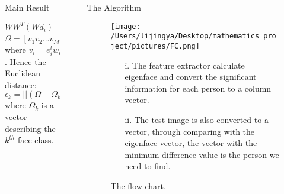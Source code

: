 \documentclass[final]{beamer}
\newlength{\sepwid}
\newlength{\onecolwid}
\newlength{\middlecolwid}
\begin{document}
\begin{frame}[t]
\begin{columns}[t]
\begin{column}{\middlecolwid}
\begin{alertblock}{Main Result}
\end{alertblock}

\vspace{-5mm}

\begin{block}

 
\begin{equation*}
WW^T(Wd_i) =\mu_i(Wd_i)
\end{equation*}
\begin{equation*}
\Omega = [v_1v_2...v_{M'}]^T
\end{equation*}
where $v_i=e_i^tw_i$. Hence the Euclidean distance:\\
\begin{equation*}
\epsilon_k = ||(\Omega - \Omega_k)||
\end{equation*}
where $\Omega_k$ is a vector describing the $k^{th}$ face class.
\end{block}
\end{column} %


\begin{column}{\sepwid}\end{column} %

\begin{column}{\onecolwid} %




\begin{block}{The Algorithm}
\begin{figure}[h]
\centering
\texttt{[image: /Users/lijingya/Desktop/mathematics\_project/pictures/FC.png]}
\caption{ The flow chart.}
\begin{itemize}
\item[i.] The feature extractor calculate eigenface and convert the significant information for each person to a column vector. 
\item[ii.] The test image is also converted to a vector, through comparing with the eigenface vector, the vector with the minimum difference value is the person we need to find.


\end{itemize}
\end{figure}
\end{block}
\end{column}
\end{columns}
\end{frame}
\end{document}
